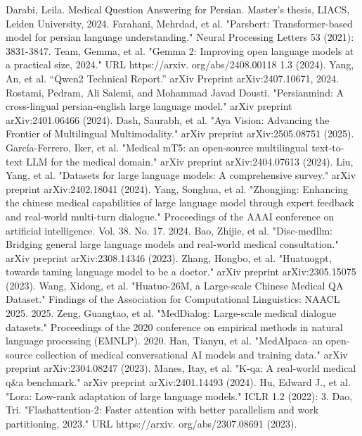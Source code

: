 \documentclass[conference]{IEEEtran}
\begin{document}
\begin{thebibliography}{00}
		Darabi, Leila. Medical Question Answering for Persian. Master’s thesis, LIACS, Leiden University, 2024.
		Farahani, Mehrdad, et al. "Parsbert: Transformer-based model for persian language understanding." Neural Processing Letters 53 (2021): 3831-3847.
		Team, Gemma, et al. "Gemma 2: Improving open language models at a practical size, 2024." URL https://arxiv. org/abs/2408.00118 1.3 (2024).
		Yang, An, et al. “Qwen2 Technical Report.” arXiv Preprint arXiv:2407.10671, 2024.
		Rostami, Pedram, Ali Salemi, and Mohammad Javad Dousti. "Persianmind: A cross-lingual persian-english large language model." arXiv preprint arXiv:2401.06466 (2024).
		Dash, Saurabh, et al. "Aya Vision: Advancing the Frontier of Multilingual Multimodality." arXiv preprint arXiv:2505.08751 (2025).
		García-Ferrero, Iker, et al. "Medical mT5: an open-source multilingual text-to-text LLM for the medical domain." arXiv preprint arXiv:2404.07613 (2024).
		Liu, Yang, et al. "Datasets for large language models: A comprehensive survey." arXiv preprint arXiv:2402.18041 (2024).
		Yang, Songhua, et al. "Zhongjing: Enhancing the chinese medical capabilities of large language model through expert feedback and real-world multi-turn dialogue." Proceedings of the AAAI conference on artificial intelligence. Vol. 38. No. 17. 2024.
		Bao, Zhijie, et al. "Disc-medllm: Bridging general large language models and real-world medical consultation." arXiv preprint arXiv:2308.14346 (2023).
		Zhang, Hongbo, et al. "Huatuogpt, towards taming language model to be a doctor." arXiv preprint arXiv:2305.15075 (2023).
		Wang, Xidong, et al. "Huatuo-26M, a Large-scale Chinese Medical QA Dataset." Findings of the Association for Computational Linguistics: NAACL 2025. 2025.
		Zeng, Guangtao, et al. "MedDialog: Large-scale medical dialogue datasets." Proceedings of the 2020 conference on empirical methods in natural language processing (EMNLP). 2020.
		Han, Tianyu, et al. "MedAlpaca--an open-source collection of medical conversational AI models and training data." arXiv preprint arXiv:2304.08247 (2023).
		Manes, Itay, et al. "K-qa: A real-world medical q\&a benchmark." arXiv preprint arXiv:2401.14493 (2024).
		Hu, Edward J., et al. "Lora: Low-rank adaptation of large language models." ICLR 1.2 (2022): 3.
		Dao, Tri. "Flashattention-2: Faster attention with better parallelism and work partitioning, 2023." URL https://arxiv. org/abs/2307.08691 (2023).

\end{thebibliography}
\end{document}
